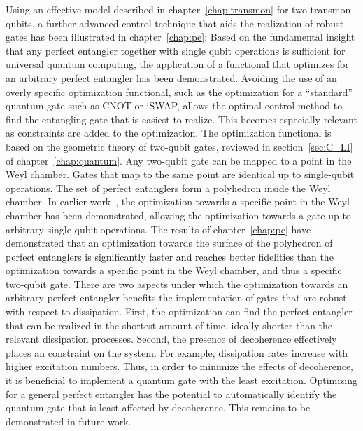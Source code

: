 Using an effective model described in chapter~\ref{chap:transmon} for two
transmon qubits, a further advanced control technique that aids the realization
of robust gates has been illustrated in chapter~\ref{chap:pe}:
Based on the fundamental insight that any perfect entangler together with single
qubit operations is sufficient for universal quantum computing, the application
of a functional that optimizes for an arbitrary perfect entangler has been
demonstrated.  Avoiding the use of an overly specific optimization functional,
such as the optimization for a ``standard'' quantum gate such as CNOT or iSWAP,
allows the optimal control method to find the entangling gate that is easiest to
realize.  This becomes especially relevant as constraints are added to the
optimization.  The optimization functional is based on the geometric theory of
two-qubit gates, reviewed in section~\ref{sec:C_LI} of
chapter~\ref{chap:quantum}. Any two-qubit gate can be mapped to a point in the
Weyl chamber. Gates that map to the same point are identical up to single-qubit
operations. The set of perfect entanglers form a polyhedron inside the Weyl
chamber.  In earlier work~\cite{ReichDipl10, MullerPRA11}, the optimization
towards a specific point in the Weyl chamber has been demonstrated, allowing the
optimization towards a gate up to arbitrary single-qubit operations. The results
of chapter~\ref{chap:pe} have demonstrated that an optimization towards the
surface of the polyhedron of perfect entanglers is significantly faster and
reaches better fidelities than the optimization towards a specific point in the
Weyl chamber, and thus a specific two-qubit gate.  There are two aspects under
which the optimization towards an arbitrary perfect entangler benefits the
implementation of gates that are robust with respect to dissipation. First, the
optimization can find the perfect entangler that can be realized in the shortest
amount of time, ideally shorter than the relevant dissipation processes. Second,
the presence of decoherence effectively places an constraint on the system. For
example, dissipation rates increase with higher excitation numbers. Thus, in
order to minimize the effects of decoherence, it is beneficial to implement
a quantum gate with the least excitation. Optimizing for a general perfect
entangler has the potential to automatically identify the quantum gate that is
least affected by decoherence.  This remains to be demonstrated in future work.

